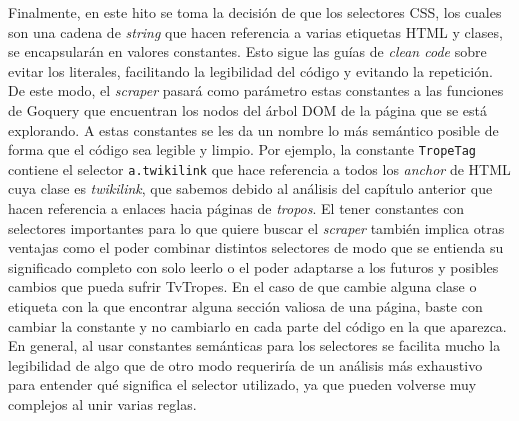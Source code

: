 Finalmente, en este hito se toma la decisión de que los selectores CSS, los
cuales son una cadena de \textit{string} que hacen referencia a varias etiquetas
HTML y clases, se encapsularán en valores constantes. Esto sigue las guías de
\textit{clean code} sobre evitar los literales, facilitando la legibilidad del
código y evitando la repetición. De este modo, el \textit{scraper} pasará como
parámetro estas constantes a las funciones de Goquery que encuentran los nodos
del árbol DOM de la página que se está explorando. A estas constantes se les da
un nombre lo más semántico posible de forma que el código sea legible y limpio.
Por ejemplo, la constante \texttt{TropeTag} contiene el selector \texttt{a.twikilink} que 
hace referencia a todos los \textit{anchor} de HTML cuya clase es
\textit{twikilink}, que sabemos debido al análisis del capítulo anterior que
hacen referencia a enlaces hacia páginas de \textit{tropos}. El tener constantes
con selectores importantes para lo que quiere buscar el \textit{scraper} también
implica otras ventajas como el poder combinar distintos selectores de modo que
se entienda su significado completo con solo leerlo o el poder adaptarse a los
futuros y posibles cambios que pueda sufrir TvTropes. En el caso de que cambie
alguna clase o etiqueta con la que encontrar alguna sección valiosa de una
página, baste con cambiar la constante y no cambiarlo en cada parte del código
en la que aparezca. En general, al usar constantes semánticas para los
selectores se facilita mucho la legibilidad de algo que de otro modo requeriría
de un análisis más exhaustivo para entender qué significa el selector utilizado,
ya que pueden volverse muy complejos al unir varias reglas.

